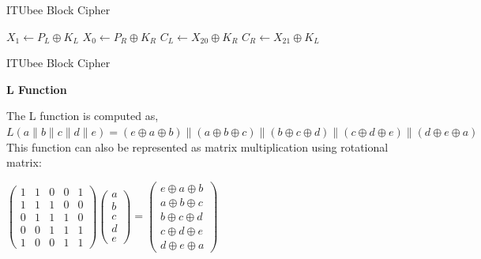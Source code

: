 \documentclass{beamer}
\begin{document}
\begin{frame}{ITUbee Block Cipher}
    
\begin{algorithm}[H]
    \DontPrintSemicolon
    $X_1 \gets P_L \oplus K_L$ \;
    $X_0 \gets P_R \oplus K_R$ \;
    $C_L \gets X_{20} \oplus K_R$\;
    $C_R \gets X_{21} \oplus K_L$\;
    \caption{Pseudo code for ITUbee encryption}
    \label{alg:ITUbee}
\end{algorithm}
\end{frame}
\begin{frame}{ITUbee Block Cipher}

\textbf{L Function} \linebreak

The L function is computed as,\\
$L(a \parallel b \parallel c \parallel d \parallel e) = (e \oplus a \oplus b) \parallel (a \oplus b \oplus c) \parallel (b \oplus c \oplus d) \parallel (c \oplus d \oplus e) \parallel (d \oplus e \oplus a)$
\\This function can also be represented as matrix multiplication using rotational matrix:

\begin{center}
    $
    \begin{pmatrix}
    1 & 1 & 0 & 0 & 1 \\
    1 & 1 & 1 & 0 & 0 \\
    0 & 1 & 1 & 1 & 0 \\
    0 & 0 & 1 & 1 & 1 \\
    1 & 0 & 0 & 1 & 1
    \end{pmatrix}
    \begin{pmatrix}
    a \\
    b \\
    c \\
    d \\
    e
    \end{pmatrix}
    =
    \begin{pmatrix}
    e \oplus a \oplus b \\
    a \oplus b \oplus c \\
    b \oplus c \oplus d \\
    c \oplus d \oplus e \\
    d \oplus e \oplus a
    \end{pmatrix}
    $
\end{center}

\end{frame}
\end{document}
